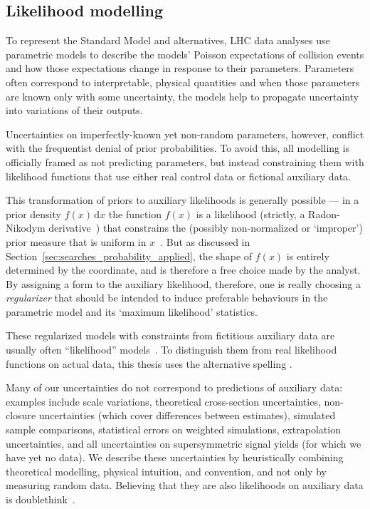 \subsection{Likelihood modelling}
To represent the Standard Model and alternatives, LHC data analyses use
parametric models to describe the models' Poisson expectations of
collision events and how those expectations change in response to their
parameters.
Parameters often correspond to interpretable, physical quantities and when
those parameters are known only with some uncertainty, the models help to
propagate uncertainty into variations of their outputs.

Uncertainties on imperfectly-known yet non-random parameters, however,
conflict with the frequentist denial of prior probabilities.
To avoid this, all modelling is officially framed as not predicting parameters,
but instead constraining them with likelihood functions that use
either real control data or fictional auxiliary data.

This transformation of priors to auxiliary likelihoods is generally possible
--- in a prior density $f(x)\,\mathrm{d}x$ the function $f(x)$ is a likelihood
(strictly, a Radon-Nikodym derivative~\cite{billingsley2008probability})
that constrains the (possibly non-normalized or `improper') prior measure that
is uniform in $x$~\cite{Cowan:2010js}.
But as discussed in Section~\ref{sec:searches_probability_applied}, the shape
of $f(x)$ is entirely determined by the coordinate, and is therefore a free
choice made by the analyst.
By assigning a form to the auxiliary likelihood, therefore, one is really
choosing a \emph{regularizer} that should be intended to induce preferable
behaviours in the parametric model and its `maximum likelihood' statistics.

These regularized models with constraints from fictitious auxiliary data
are usually often ``likelihood'' models~\cite{
cranmer2012histfactory,
baak2015histfitter,
Besjes_2015,
heinrich2021pyhf
}.
To distinguish them from real likelihood functions on actual data, this
thesis uses the alternative spelling \textbf{\heplikelihood}.

Many of our uncertainties do not correspond to predictions of auxiliary data:
examples include
scale variations,
theoretical cross-section uncertainties,
non-closure uncertainties (which cover differences between estimates),
simulated sample comparisons,
statistical errors on weighted simulations,
extrapolation uncertainties,
and
all uncertainties on supersymmetric signal yields
(for which we have yet no data).
We describe these uncertainties by heuristically
combining theoretical modelling, physical intuition, and convention,
and not only by measuring random data.
Believing that they are also likelihoods on auxiliary data is
doublethink~\cite{orwell1949nnineteen}.

